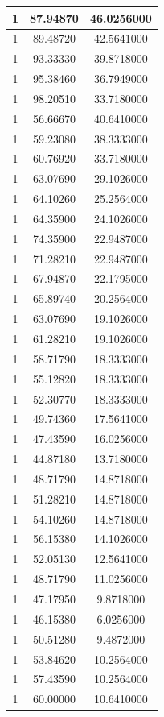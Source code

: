 \documentclass[
]{book}
\begin{document}
\begin{tabular}{c|c|c}
\hline
1 & 87.94870 & 46.0256000\\
\hline
1 & 89.48720 & 42.5641000\\
\hline
1 & 93.33330 & 39.8718000\\
\hline
1 & 95.38460 & 36.7949000\\
\hline
1 & 98.20510 & 33.7180000\\
\hline
1 & 56.66670 & 40.6410000\\
\hline
1 & 59.23080 & 38.3333000\\
\hline
1 & 60.76920 & 33.7180000\\
\hline
1 & 63.07690 & 29.1026000\\
\hline
1 & 64.10260 & 25.2564000\\
\hline
1 & 64.35900 & 24.1026000\\
\hline
1 & 74.35900 & 22.9487000\\
\hline
1 & 71.28210 & 22.9487000\\
\hline
1 & 67.94870 & 22.1795000\\
\hline
1 & 65.89740 & 20.2564000\\
\hline
1 & 63.07690 & 19.1026000\\
\hline
1 & 61.28210 & 19.1026000\\
\hline
1 & 58.71790 & 18.3333000\\
\hline
1 & 55.12820 & 18.3333000\\
\hline
1 & 52.30770 & 18.3333000\\
\hline
1 & 49.74360 & 17.5641000\\
\hline
1 & 47.43590 & 16.0256000\\
\hline
1 & 44.87180 & 13.7180000\\
\hline
1 & 48.71790 & 14.8718000\\
\hline
1 & 51.28210 & 14.8718000\\
\hline
1 & 54.10260 & 14.8718000\\
\hline
1 & 56.15380 & 14.1026000\\
\hline
1 & 52.05130 & 12.5641000\\
\hline
1 & 48.71790 & 11.0256000\\
\hline
1 & 47.17950 & 9.8718000\\
\hline
1 & 46.15380 & 6.0256000\\
\hline
1 & 50.51280 & 9.4872000\\
\hline
1 & 53.84620 & 10.2564000\\
\hline
1 & 57.43590 & 10.2564000\\
\hline
1 & 60.00000 & 10.6410000\\

\end{tabular}
\end{document}
